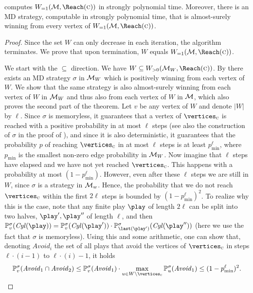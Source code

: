 \begin{theorem}
\label{5-thm:as-char}
 computes $\winAS(\mdp,\Reach(\genColour))$ in strongly polynomial time. Moreover, there is an MD strategy, computable in strongly polynomial time, that is almost-surely winning from every vertex of $\winAS(\mdp,\Reach(\genColour))$.
\end{theorem}
\begin{proof}
Since the set $ W $ can only decrease in each iteration, the algorithm terminates.
We prove that upon termination, $W$ equals $\winAS(\mdp,\Reach(\genColour))$.
	
We start with the $ \subseteq $ direction. We have $W \subseteq \winPos(\mdp_W,\Reach(\genColour))$. By  there exists an MD strategy $\sigma$ in $\mathcal{M}_W$ which is positively winning from each vertex of $W$. We show that the same strategy is also almost-surely winning from each vertex of $W$ in $\mathcal{M}_W$ and thus also from each vertex of $W$ in $\mathcal{M}$, which also proves the second part of the theorem. 
Let $v$ be any vertex of $W$ and denote $|W|$ by $\ell$. Since $\sigma$ is memoryless, it guarantees that a vertex of $\vertices_{\genColour}$ is reached with a positive probability in at most $\ell$ steps (see also the construction of $ \sigma $ in the proof of ), and since it is also deterministic, it guarantees that the probability $p$ of reaching $\vertices_{\genColour}$ in at most $\ell$ steps is at least $p_{\min}^{\ell}$, where  $p_{\min}$ is the smallest non-zero edge probability in $\mathcal{M}_W$. Now imagine that $\ell$ steps have elapsed and we have not yet reached $\vertices_{\genColour}$. This happens with a probability at most $(1-p_{\min}^\ell)$. However, even after these $\ell$ steps we are still in $W$, since $ \sigma  $ is a strategy in $ \mathcal{M}_w $. Hence, the probability that we do not reach $\vertices_\genColour$ within the first $2\ell$ steps is bounded by $(1-p_{\min}^\ell)^{2}$. To realize why this is the case, note that any finite play $\play$ of length $2\ell$ can be split into two halves, $\play',\play''$ of length $\ell$, and then $\probm^{\sigma}_{v}(\cylinder(\play))=\probm^{\sigma}_{v}(\cylinder(\play'))\cdot\probm^{\sigma}_{\last(\play')}(\cylinder(\play''))$ (here we use the fact that $\sigma$ is memoryless). Using this and some arithmetic, one can show that, denoting $\mathit{Avoid}_i$ the set of all plays that avoid the vertices of $\vertices_{\genColour}$ in steps $\ell\cdot(i-1)$ to $\ell\cdot(i)-1$, it holds $$\probm^{\sigma}_{v}(\mathit{Avoid}_1\cap \mathit{Avoid}_2) \leq \probm^{\sigma}_{v}(\mathit{Avoid}_1)\cdot \max_{u\in W\setminus \vertices_{\genColour}}\probm^{\sigma}_{u}(\mathit{Avoid}_1)\leq (1-p_{\min}^\ell)^{2}.$$


\end{proof}
